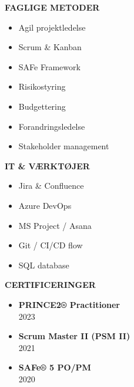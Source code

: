 \documentclass[10pt,a4paper]{article}
\begin{document}
\begin{minipage}[t]{0.32\textwidth}
    
    \begin{tcolorbox}[
        colback=lightbg,
        colframe=bordergray,
        arc=4pt,
        boxrule=1pt,
        top=10pt,
        bottom=10pt,
        left=10pt,
        right=10pt
    ]
        {\color{primary}\large\bfseries FAGLIGE METODER} \\{}%
        \vspace{0.15cm}
        \begin{itemize}[leftmargin=*,nosep,label=\textcolor{secondary}{\tiny$\blacksquare$}]
            \item Agil projektledelse
            \item Scrum \& Kanban
            \item SAFe Framework
            \item Risikostyring
            \item Budgettering
            \item Forandringsledelse
            \item Stakeholder management
        \end{itemize}
        
        \vspace{0.4cm}
        {\color{primary}\large\bfseries IT \& VÆRKTØJER} \\{}%
        \vspace{0.15cm}
        \begin{itemize}[leftmargin=*,nosep,label=\textcolor{secondary}{\tiny$\blacksquare$}]
            \item Jira \& Confluence
            \item Azure DevOps
            \item MS Project / Asana
            \item Git / CI/CD flow
            \item SQL database
        \end{itemize}
        
        \vspace{0.4cm}
        {\color{primary}\large\bfseries CERTIFICERINGER} \\{}%
        \vspace{0.15cm}
        \begin{itemize}[leftmargin=*,nosep,label=\textcolor{secondary}{\tiny$\blacksquare$}]
            \item \textbf{PRINCE2® Practitioner} \\ {\scriptsize 2023}
            \item \textbf{Scrum Master II (PSM II)} \\ {\scriptsize 2021}
            \item \textbf{SAFe® 5 PO/PM} \\ {\scriptsize 2020}
        \end{itemize}
        

\end{tcolorbox}
\end{minipage}
\end{document}
